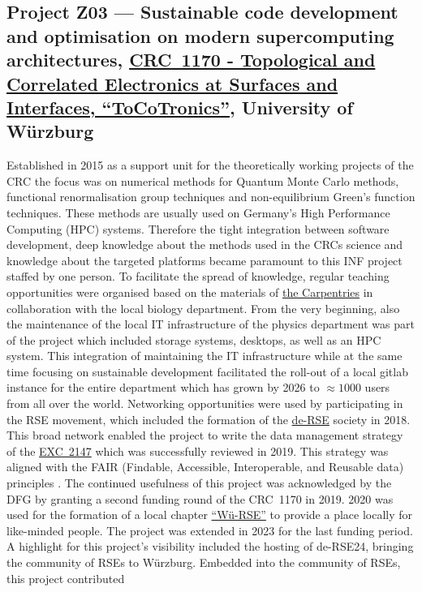 \documentclass{eceasst}
\begin{document}
\subsection{Project Z03 --- Sustainable code development and optimisation on modern supercomputing architectures, \href{https://gepris.dfg.de/gepris/projekt/258499086?language=en}{CRC~1170 - Topological and Correlated Electronics at Surfaces and Interfaces, ``ToCoTronics''}, University of Würzburg}
Established in 2015 as a support unit for the theoretically working projects of the CRC the focus was on numerical methods for Quantum Monte Carlo methods, functional renormalisation group techniques and non-equilibrium Green's function techniques. These methods are usually used on
Germany's High Performance Computing (HPC) systems. Therefore the tight integration between software development, deep knowledge about the methods used in the CRCs science and knowledge about the targeted platforms became paramount to this INF project staffed by one person.
To facilitate the spread of knowledge, regular teaching opportunities were organised based on the materials of \href{https://carpentries.org/}{the Carpentries} in collaboration with the local biology department.
From the very beginning, also the maintenance of the local IT infrastructure of the physics department was part of the project which included
storage systems, desktops, as well as an HPC system.
This integration of maintaining the IT infrastructure while at the same time focusing on sustainable development
facilitated the roll-out of a local gitlab instance for the entire department which has grown by 2026 to $\approx 1000$ users from all
over the world. Networking opportunities were used by participating in the RSE movement, which included the formation of the \href{https://de-rse.org/de/index.html}{de-RSE} society in 2018.
This broad network enabled the project to write the data management strategy of the \href{https://www.ctdqmat.de/}{EXC~2147} which was successfully reviewed in 2019. This strategy was aligned with the FAIR (Findable, Accessible, Interoperable, and Reusable data) principles \cite{WilkinsonDumontier2016}.
The continued usefulness of this project was acknowledged by the DFG by granting a second funding round of the CRC~1170 in 2019.
2020 was used for the formation of a local chapter \href{https://de-rse.org/chapter/wue/}{``Wü-RSE''} to provide a place
locally for like-minded people. The project was extended in 2023 for the last funding period. A highlight for this project's visibility included the hosting of de-RSE24, bringing the community of RSEs to Würzburg. Embedded into the community of RSEs, this project contributed
\end{document}

